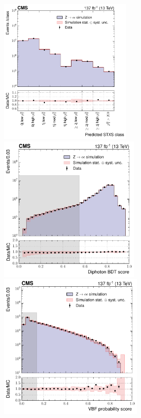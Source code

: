\begin{figure}
  \centering
  \hfill
  \includegraphics[height=7.25cm]{Figures/hgg_overview/DYValidation_ggH_argmax_ratioPlot_logPlot.pdf}
  \hfill
  \includegraphics[height=7.25cm]{Figures/hgg_overview/DYValidation_DiphoBDT_ratioPlot_dipho_mva_logPlot.pdf}
  \includegraphics[height=7.25cm]{Figures/hgg_overview/DYValidation_VBFBDT_ratioPlot_vbfMvaResult_prob_VBF_logPlot.pdf}

\end{figure}
